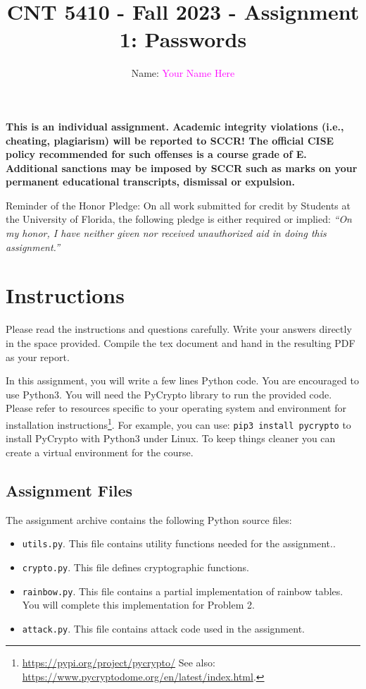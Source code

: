 \documentclass[11pt,letterpaper]{article}
\begin{document}
\title{CNT 5410 - Fall 2023 - Assignment 1: Passwords}

\author{Name: \textcolor{magenta}{Your Name Here}}

\maketitle

\begin{center}
	\color{red}\bf This is an individual assignment. Academic integrity violations (i.e., cheating, plagiarism) will be reported to SCCR!
	The official CISE policy recommended for such offenses is a course grade of E. Additional sanctions may be imposed by SCCR such as marks on your permanent educational transcripts, dismissal or expulsion.
	
	\medskip

	Reminder of the Honor Pledge: On all work submitted for credit by Students at the University of Florida, the following pledge is either required or implied: {\em ``On my honor, I have neither given nor received unauthorized aid in doing this assignment.''}
\end{center}

\section*{Instructions}
%

Please read the instructions and questions carefully. Write your answers directly in the space provided. Compile the tex document and hand in the resulting PDF as your report.

In this assignment, you will write a few lines Python code. You are encouraged to use Python3. You will need the PyCrypto library to run the provided code. Please refer to resources specific to your operating system and environment for installation instructions\footnote{\url{https://pypi.org/project/pycrypto/} See also:  \url{https://www.pycryptodome.org/en/latest/index.html}.}. For example, you can use: \texttt{pip3 install pycrypto} to install PyCrypto with Python3 under Linux. To keep things cleaner you can create a virtual environment for the course.

\subsection*{Assignment Files}
The assignment archive contains the following Python source files:
%
\begin{itemize}[nolistsep]
	\item \texttt{utils.py}. This file contains utility functions needed for the assignment..
	\item \texttt{crypto.py}. This file defines cryptographic functions. 
	\item \texttt{rainbow.py}. This file contains a partial implementation of rainbow tables. You will complete this implementation for Problem 2.
	\item \texttt{attack.py}. This file contains attack code used in the assignment.
\end{itemize}
\end{document}
